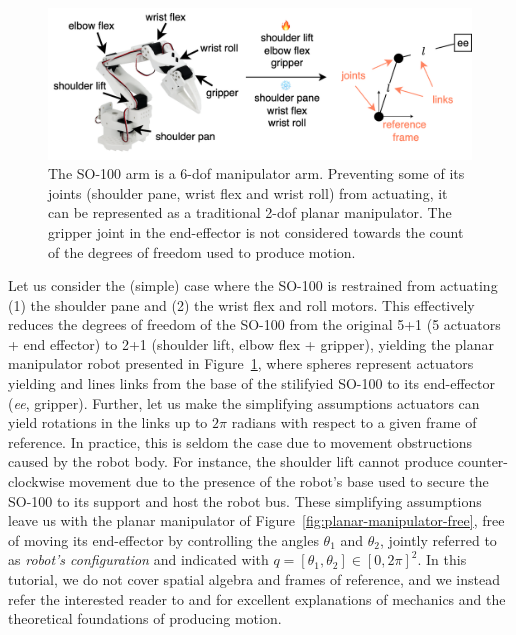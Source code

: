 \begin{figure}
    \centering
    \includegraphics[width=0.7\linewidth]{figures/ch2/ch2-so100-to-planar-manipulator.png}
    \caption{The SO-100 arm is a 6-dof manipulator arm. Preventing some of its joints (shoulder pane, wrist flex and wrist roll) from actuating, it can be represented as a traditional 2-dof planar manipulator. The gripper joint in the end-effector is not considered towards the count of the degrees of freedom used to produce motion.}
    \label{fig:make-so100-planar-manipulator}
\end{figure}

Let us consider the (simple) case where the SO-100 is restrained from actuating (1) the shoulder pane and (2) the wrist flex and roll motors. 
This effectively reduces the degrees of freedom of the SO-100 from the original 5+1 (5 actuators + end effector) to 2+1 (shoulder lift, elbow flex + gripper), yielding the planar manipulator robot presented in Figure~\ref{fig:make-so100-planar-manipulator}, where spheres represent actuators yielding and lines links from the base of the stilifyied SO-100 to its end-effector (\emph{ee}, gripper).
Further, let us make the simplifying assumptions actuators can yield rotations in the links up to \( 2 \pi \) radians with respect to a given frame of reference.
In practice, this is seldom the case due to movement obstructions caused by the robot body. 
For instance, the shoulder lift cannot produce counter-clockwise movement due to the presence of the robot's base used to secure the SO-100 to its support and host the robot bus.
These simplifying assumptions leave us with the planar manipulator of Figure~\ref{fig:planar-manipulator-free}, free of moving its end-effector by controlling the angles \( \theta_1 \) and \( \theta_2 \), jointly referred to as \emph{robot's configuration} and indicated with \( q = [\theta_1, \theta_2 ] \in [0, 2\pi]^2 \).
In this tutorial, we do not cover spatial algebra and frames of reference, and we instead refer the interested reader to \cite[Chapter~2]{lynchModernRoboticsMechanics2017} and \cite[Chapter~3]{tedrakeRoboticManipulationPerception} for excellent explanations of mechanics and the theoretical foundations of producing motion.

